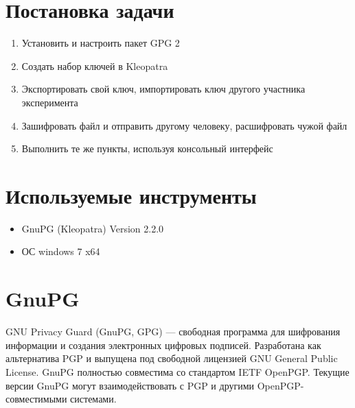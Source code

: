\newpage
\section{Постановка задачи}
\begin{enumerate}
	\item Установить и настроить пакет GPG 2
	\item Создать набор ключей в Kleopatra
	\item Экспортировать свой ключ, импортировать ключ другого участника эксперимента
	\item Зашифровать файл и отправить другому человеку, расшифровать чужой файл
	\item Выполнить те же пункты, используя консольный интерфейс
\end{enumerate}
\section{Используемые инструменты}
\begin{itemize}
\item GnuPG (Kleopatra) Version 2.2.0
\item ОС windows 7 x64
\end{itemize}
\section{GnuPG}
GNU Privacy Guard (GnuPG, GPG) — свободная программа для шифрования информации и создания электронных цифровых подписей. Разработана как альтернатива PGP и выпущена под свободной лицензией GNU General Public License. GnuPG полностью совместима со стандартом IETF OpenPGP. Текущие версии GnuPG могут взаимодействовать с PGP и другими OpenPGP-совместимыми системами.

